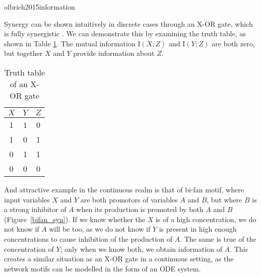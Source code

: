 \documentclass[../main.tex]{subfiles}
\begin{document}
olbrich2015information

Synergy can be shown intuitively in discrete cases through an X-OR gate, which is fully synergistic \cite{quax2017quantifying}.
We can demonstrate this by examining the truth table, as shown in Table \ref{XOR}.
The mutual information $\mathrm{I}(X;Z)$ and $\mathrm{I}(Y;Z)$ are both zero, but together $X$ and $Y$ provide information about $Z$.

\begin{table}
\begin{center}
\begin{tabular}{|c|c||c|}
\hline
$X$ & $Y$ & $Z$ \\
\hline
\hline
1 & 1 & 0 \\
1 & 0 & 1 \\
0 & 1 & 1 \\
0 & 0 & 0 \\
\hline
\end{tabular}
\end{center}
\caption{Truth table of an X-OR gate}
\label{XOR}
\end{table}

And attractive example in the continuous realm is that of bi-fan motif, where input variables $X$ and $Y$ are both promotors of variables $A$ and $B$, but where $B$ is a strong inhibitor of $A$ when its production is promoted by both $A$ and $B$ (Figure~\ref{bifan_syn}).
If we know whether the $X$ is of a high concentration, we do not know if $A$ will be too, as we do not know if $Y$ is present in high enough concentrations to cause inhibition of the production of $A$.
The same is true of the concentration of $Y$; only when we know both, we obtain information of $A$.
This creates a similar situation as an X-OR gate in a continuous setting, as the network motifs can be modelled in the form of an ODE system.
\end{document}
